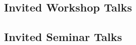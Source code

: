 \documentclass[10pt,a4paper,sans]{moderncv}
\begin{document}
% 
% 
% 
% 
% 
% 
% 


 \subsection{Invited Workshop Talks}
 
 

%

\subsection{Invited Seminar Talks}



\end{document}
